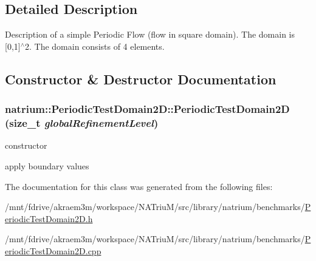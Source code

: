 \subsection{Detailed Description}
Description of a simple Periodic Flow (flow in square domain). The domain is \mbox{[}0,1\mbox{]}$^\wedge$2. The domain consists of 4 elements. 

\subsection{Constructor \& Destructor Documentation}
\hypertarget{classnatrium_1_1PeriodicTestDomain2D_a930da37a3e1be744aaf59e27ba956318}{
\subsubsection[{PeriodicTestDomain2D}]{\setlength{\rightskip}{0pt plus 5cm}natrium::PeriodicTestDomain2D::PeriodicTestDomain2D (size\_\-t {\em globalRefinementLevel})}}
\label{classnatrium_1_1PeriodicTestDomain2D_a930da37a3e1be744aaf59e27ba956318}


constructor 

apply boundary values 

The documentation for this class was generated from the following files:\begin{DoxyCompactItemize}
\item 
/mnt/fdrive/akraem3m/workspace/NATriuM/src/library/natrium/benchmarks/\hyperlink{PeriodicTestDomain2D_8h}{PeriodicTestDomain2D.h}\item 
/mnt/fdrive/akraem3m/workspace/NATriuM/src/library/natrium/benchmarks/\hyperlink{PeriodicTestDomain2D_8cpp}{PeriodicTestDomain2D.cpp}\end{DoxyCompactItemize}
